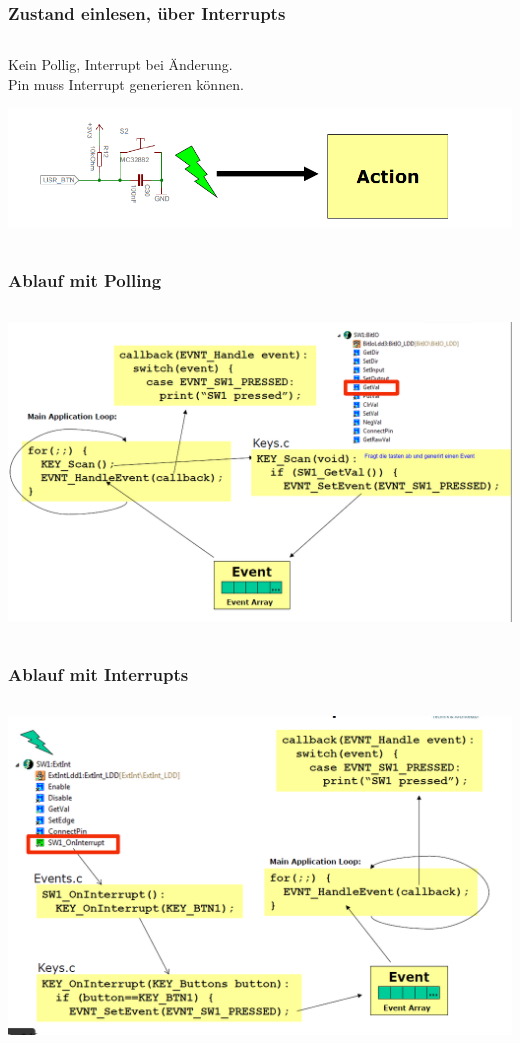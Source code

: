 \begin{frame}
	\frametitle{Zustand einlesen, über Interrupts}
	\begin{column}{1\linewidth}
		Kein Pollig, Interrupt bei Änderung.\\
		Pin muss Interrupt generieren können.
		\begin{center}
			\includegraphics[width=1\textwidth]{images/Interrupt.PNG}
		\end{center}
	\end{column}
\end{frame}

\begin{frame}
	\frametitle{Ablauf mit Polling}
	\begin{column}{1\linewidth}
		\begin{center}
			\includegraphics[width=1\textwidth]{images/Taster_Polling.PNG}
		\end{center}
	\end{column}
\end{frame}

\begin{frame}
	\frametitle{Ablauf mit Interrupts}
	\begin{column}{1\linewidth}
		\begin{center}
			\includegraphics[width=1\textwidth]{images/Intrerrupt_Routine.PNG}
		\end{center}
	\end{column}
\end{frame}